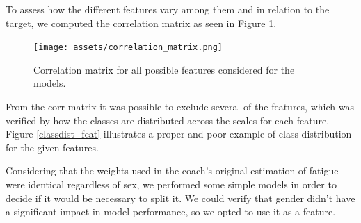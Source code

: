 \documentclass[conference]{IEEEtran}
\begin{document}
To assess how the different features vary among them and in relation to the target, we computed the correlation matrix as seen in Figure \ref{fig:correlationMatrix}.

\begin{figure}[H]
    \centering
    \texttt{[image: assets/correlation\_matrix.png]}
    \caption{Correlation matrix for all possible features considered for the models.}
    \label{fig:correlationMatrix}
\end{figure}

From the corr matrix it was possible to exclude several of the features, which was verified by how the classes are distributed across the scales for each feature. Figure \ref{classdist_feat} illustrates a proper and poor example of class distribution for the given features.

Considering that the weights used in the coach's original estimation of fatigue were identical regardless of sex, we performed some simple models in order to decide if it would be necessary to split it. We could verify that gender didn't have a significant impact in model performance, so we opted to use it as a feature. 
\end{document}
